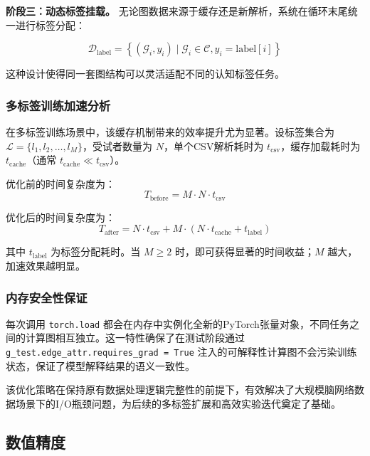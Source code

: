 \documentclass[UTF8, a4paper, 12pt]{article}
\begin{document}
\textbf{阶段三：动态标签挂载。} 无论图数据来源于缓存还是新解析，系统在循环末尾统一进行标签分配：

\begin{equation}
\mathcal{D}_{\text{label}} = \left\{ (\mathcal{G}_i, y_i) \mid \mathcal{G}_i \in \mathcal{C}, y_i = \text{label}[i] \right\}
\end{equation}

这种设计使得同一套图结构可以灵活适配不同的认知标签任务。

\subsubsection{多标签训练加速分析}

在多标签训练场景中，该缓存机制带来的效率提升尤为显著。设标签集合为 $\mathcal{L} = \{l_1, l_2, \ldots, l_M\}$，受试者数量为 $N$，单个CSV解析耗时为 $t_{\text{csv}}$，缓存加载耗时为 $t_{\text{cache}}$（通常 $t_{\text{cache}} \ll t_{\text{csv}}$）。

优化前的时间复杂度为：
\begin{equation}
T_{\text{before}} = M \cdot N \cdot t_{\text{csv}}
\end{equation}

优化后的时间复杂度为：
\begin{equation}
T_{\text{after}} = N \cdot t_{\text{csv}} + M \cdot (N \cdot t_{\text{cache}} + t_{\text{label}})
\end{equation}

其中 $t_{\text{label}}$ 为标签分配耗时。当 $M \geq 2$ 时，即可获得显著的时间收益；$M$ 越大，加速效果越明显。

\subsubsection{内存安全性保证}

每次调用 \texttt{torch.load} 都会在内存中实例化全新的PyTorch张量对象，不同任务之间的计算图相互独立。这一特性确保了在测试阶段通过 \texttt{g\_test.edge\_attr.requires\_grad = True} 注入的可解释性计算图不会污染训练状态，保证了模型解释结果的语义一致性。

该优化策略在保持原有数据处理逻辑完整性的前提下，有效解决了大规模脑网络数据场景下的I/O瓶颈问题，为后续的多标签扩展和高效实验迭代奠定了基础。

\subsection{数值精度}
\end{document}
